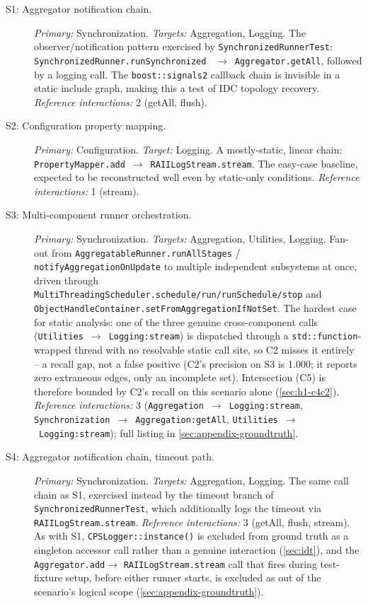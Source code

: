 \begin{description}
  \item[S1: Aggregator notification chain.]
    \emph{Primary:} Synchronization. \emph{Targets:} Aggregation, Logging.
    The observer/notification pattern exercised by
    \texttt{SynchronizedRunnerTest}: \texttt{SynchronizedRunner.runSynchronized}
    ~$\to$~\texttt{Aggregator.getAll}, followed by a logging call. The
    \texttt{boost::signals2} callback chain is invisible in a static
    include graph, making this a test of IDC topology recovery.
    \emph{Reference interactions:} 2 (getAll, flush).

  \item[S2: Configuration property mapping.]
    \emph{Primary:} Configuration. \emph{Target:} Logging. A mostly-static,
    linear chain: \texttt{PropertyMapper.add}~$\to$~\texttt{RAIILogStream.stream}.
    The easy-case baseline, expected to be reconstructed well even by
    static-only conditions. \emph{Reference interactions:} 1 (stream).

  \item[S3: Multi-component runner orchestration.]
    \emph{Primary:} Synchronization. \emph{Targets:} Aggregation, Utilities,
    Logging. Fan-out from \texttt{AggregatableRunner.runAllStages} /
    \texttt{notifyAggregationOnUpdate} to multiple independent
    subsystems at once, driven through
    \texttt{MultiThreadingScheduler.schedule/run/runSchedule/stop} and
    \texttt{ObjectHandleContainer.setFromAggregationIfNotSet}. The
    hardest case for static analysis: one of the three genuine
    cross-component calls (\texttt{Utilities}~$\to$~\texttt{Logging:stream})
    is dispatched through a \texttt{std::function}-wrapped thread with
    no resolvable static call site, so C2 misses it entirely -- a
    recall gap, not a false positive (C2's precision on S3 is 1.000; it
    reports zero extraneous edges, only an incomplete set). Intersection
    (C5) is therefore bounded by C2's recall on this scenario alone
    (\cref{sec:h1-c4c2}). \emph{Reference interactions:} 3
    (\texttt{Aggregation}~$\to$~\texttt{Logging:stream},
    \texttt{Synchronization}~$\to$~\texttt{Aggregation:getAll},
    \texttt{Utilities}~$\to$~\texttt{Logging:stream}); full listing in
    \cref{sec:appendix-groundtruth}.

  \item[S4: Aggregator notification chain, timeout path.]
    \emph{Primary:} Synchronization. \emph{Targets:} Aggregation, Logging.
    The same call chain as S1, exercised instead by the timeout branch
    of \texttt{SynchronizedRunnerTest}, which additionally logs the
    timeout via \texttt{RAIILogStream.stream}.
    \emph{Reference interactions:} 3 (getAll, flush, stream). As with
    S1, \texttt{CPSLogger::instance()} is excluded from ground truth as
    a singleton accessor call rather than a genuine interaction
    (\cref{sec:idt}), and the \texttt{Aggregator.add}$\to$
    \texttt{RAIILogStream.stream} call that fires during test-fixture
    setup, before either runner starts, is excluded as out of the
    scenario's logical scope (\cref{sec:appendix-groundtruth}).
\end{description}

